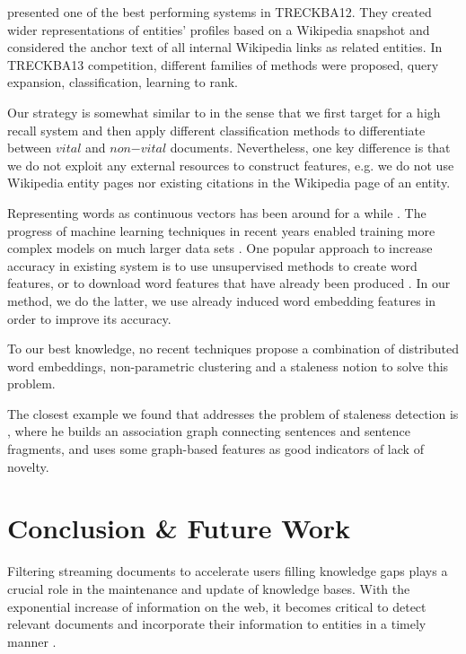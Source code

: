 \documentclass{article}
\begin{document}
\citet{xitong12} presented one of the best performing systems in TRECKBA12. They created wider representations of entities' profiles based on a Wikipedia snapshot and considered the anchor text of all internal Wikipedia links as related entities. In TRECKBA13 competition, different families of methods were proposed, query expansion, classification, learning to rank. 

Our strategy is somewhat similar to \citet{jingang13} in the sense that we first target for a high recall system and then apply different classification methods to differentiate between $vital$ and $non\mathord{-}vital$ documents. Nevertheless, one key difference is that we do not exploit any external resources to construct features, e.g. we do not use Wikipedia entity pages nor existing citations in the Wikipedia page of an entity. 

Representing words as continuous vectors has been around for a while \cite{Hinton87, Elman90findingstructure}. The progress of machine learning techniques in recent years enabled training more complex models on much larger data sets \cite{mikolovChen}. One popular approach to increase accuracy in existing system is to use unsupervised methods to create word features, or to download word features that have already been produced \cite{Turian10wordrepresentations}. In our method, we do the latter, we use already induced word embedding features in order to improve its accuracy.

To our best knowledge, no recent techniques propose a combination of distributed word embeddings, non-parametric clustering and a staleness notion to solve this problem. 

The closest example we found that addresses the problem of staleness detection is \cite{gamon}, where he builds an association graph connecting sentences and sentence fragments, and uses some graph-based features as good indicators of lack of novelty.

\section{Conclusion \& Future Work}
\label{conclusion}

Filtering streaming documents to accelerate users filling knowledge gaps plays a crucial role in the maintenance and update of knowledge bases.
With the exponential increase of information on the web, it becomes critical to detect relevant documents and incorporate their information to entities in a timely manner \cite{jingang13}.
\end{document}
